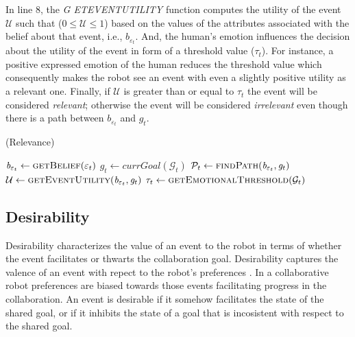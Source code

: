\documentclass[letterpaper]{article}
\begin{document}
In line 8, the \textit{G{\fontsize{8}{8}\selectfont
ET}E{\fontsize{8}{8}\selectfont VENT}U{\fontsize{8}{8}\selectfont TILITY}}
function computes the utility of the event $\mathcal{U}$ such that ($0 \leq
\mathcal{U} \leq 1$) based on the values of the attributes associated with the
belief about that event, i.e., $\mathit{b}_{\varepsilon_t}$. And, the human's
emotion influences the decision about the utility of the event in form of a
threshold value ($\tau_{t}$). For instance, a positive expressed emotion of the
human reduces the threshold value which consequently makes the robot see an
event with even a slightly positive utility as a relevant one. Finally, if
$\mathcal{U}$ is greater than or equal to $\tau_{t}$ the event will be
considered \textit{relevant}; otherwise the event will be considered
\textit{irrelevant} even though there is a path between
$\mathit{b}_{\varepsilon_t}$ and $g_{t}$.

\begin{algorithm}
	\caption{(Relevance)}
	\label{alg:relevance}
	\begin{algorithmic}[1]
			\Statex
			\State $\mathit{b}_{\varepsilon_t} \gets \Call{getBelief}{\varepsilon_t}$
			\State $\mathit{g}_{t} \gets \textit{currGoal}{(\mathcal{G}_{t})}$
			\Statex
			\State $\mathcal{P}_{t} \gets \Call{findPath}{\mathit{b}_{\varepsilon_t},
			\mathit{g}_{t}}$
			\Statex
				\State {}
			\Else
				\State $\mathcal{U} \gets \Call{getEventUtility}{\mathit{b}_{\varepsilon_t},
				\mathit{g}_{t}}$ 
				\State $\tau_{t} \gets \Call{getEmotionalThreshold}{\mathcal{G}_{t}}$
				\State {}
				\Else
					\State {}
				\EndIf
			\EndIf
		\EndFunction
	\end{algorithmic}
\end{algorithm}

\subsection{Desirability}

Desirability characterizes the value of an event to the robot in terms of
whether the event facilitates or thwarts the collaboration goal. Desirability
captures the valence of an event with repect to the robot's preferences
\cite{gratch:domain-independent}. In a collaborative robot preferences are
biased towards those events facilitating progress in the collaboration. An event
is desirable if it somehow facilitates the state of the shared goal, or if it
inhibits the state of a goal that is incosistent with respect to the shared
goal.
\end{document}
